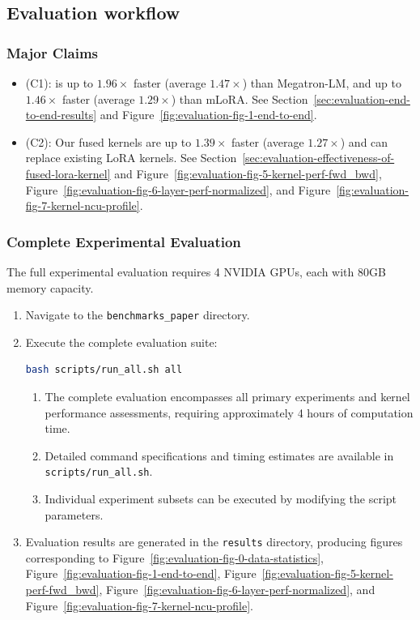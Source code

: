\subsection{Evaluation workflow}

\subsubsection{Major Claims}

\begin{itemize}
    \item (C1): \Name is up to $1.96\times$ faster (average $1.47\times$) than Megatron-LM, and up to $1.46\times$ faster (average $1.29\times$) than mLoRA. See Section~\ref{sec:evaluation-end-to-end-results} and Figure~\ref{fig:evaluation-fig-1-end-to-end}.
    \item (C2): Our fused kernels are up to $1.39\times$ faster (average $1.27\times$) and can replace existing LoRA kernels. See Section~\ref{sec:evaluation-effectiveness-of-fused-lora-kernel} and Figure~\ref{fig:evaluation-fig-5-kernel-perf-fwd_bwd}, Figure~\ref{fig:evaluation-fig-6-layer-perf-normalized}, and Figure~\ref{fig:evaluation-fig-7-kernel-ncu-profile}.
\end{itemize}

\subsubsection{Complete Experimental Evaluation}

The full experimental evaluation requires 4 NVIDIA GPUs, each with 80GB memory capacity.

\begin{enumerate}
    \item Navigate to the \texttt{benchmarks\_paper} directory.
    \item Execute the complete evaluation suite:
    \vspace{3pt}
\begin{lstlisting}[language=bash]
bash scripts/run_all.sh all
\end{lstlisting}
    \begin{enumerate}
        \item The complete evaluation encompasses all primary experiments and kernel performance assessments, requiring approximately 4 hours of computation time.
        \item Detailed command specifications and timing estimates are available in \texttt{scripts/run\_all.sh}.
        \item Individual experiment subsets can be executed by modifying the script parameters.
    \end{enumerate}
    \item Evaluation results are generated in the \texttt{results} directory, producing figures corresponding to Figure~\ref{fig:evaluation-fig-0-data-statistics}, Figure~\ref{fig:evaluation-fig-1-end-to-end}, Figure~\ref{fig:evaluation-fig-5-kernel-perf-fwd_bwd}, Figure~\ref{fig:evaluation-fig-6-layer-perf-normalized}, and Figure~\ref{fig:evaluation-fig-7-kernel-ncu-profile}.
\end{enumerate}

